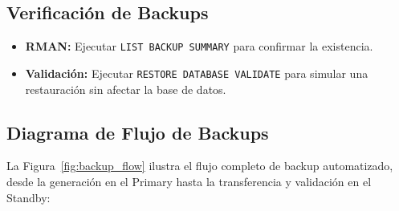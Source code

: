 \documentclass[11pt, a4paper]{report}
\begin{document}
\subsection{Verificación de Backups}
\begin{itemize}
    \item \textbf{RMAN:} Ejecutar \texttt{LIST BACKUP SUMMARY} para confirmar la existencia.
\item \textbf{Validación:} Ejecutar \texttt{RESTORE DATABASE VALIDATE} para simular una restauración sin afectar la base de datos.
\end{itemize}

\subsection{Diagrama de Flujo de Backups}

La Figura~\ref{fig:backup_flow} ilustra el flujo completo de backup automatizado, desde la generación en el Primary hasta la transferencia y validación en el Standby:
\end{document}
